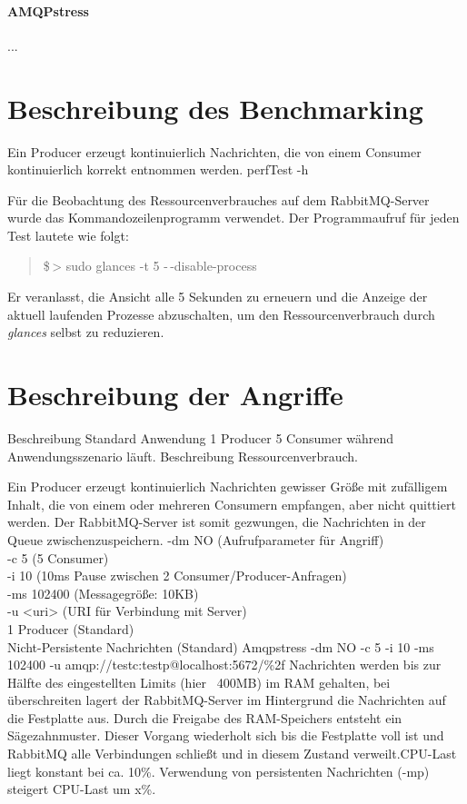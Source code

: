 \documentclass[	a4paper,
			11pt,
			titlepage,
			oneside,
			fleqn,
			listof=totoc,
			parskip,
			chapterprefix=false,
			numbers=noenddot]{scrartcl}
\begin{document}
	
	\paragraph{AMQPstress} ...
	
\clearpage
\section*{Beschreibung des Benchmarking}

		{Ein Producer erzeugt kontinuierlich Nachrichten, die von einem Consumer kontinuierlich korrekt entnommen werden.}%
		{perfTest -h}%
		{}

	Für die Beobachtung des Ressourcenverbrauches auf dem RabbitMQ-Server wurde das Kommandozeilenprogramm  verwendet. Der Programmaufruf für jeden Test lautete wie folgt:
	\begin{quote}
		\ttfamily
		\$\,> sudo glances -t 5 -\,-disable-process
	\end{quote}
	Er veranlasst, die Ansicht alle 5 Sekunden zu erneuern und die Anzeige der aktuell laufenden Prozesse abzuschalten, um den Ressourcenverbrauch durch \textsl{glances} selbst zu reduzieren.
	
\clearpage
\section*{Beschreibung der Angriffe}

	Beschreibung Standard Anwendung 1 Producer 5 Consumer während Anwendungsszenario läuft. Beschreibung Ressourcenverbrauch.

\clearpage
		{Ein Producer erzeugt kontinuierlich Nachrichten gewisser Größe mit zufälligem Inhalt, die von einem oder mehreren Consumern empfangen, aber nicht quittiert werden.%
		 Der RabbitMQ-Server ist somit gezwungen, die Nachrichten in der Queue zwischenzuspeichern.}%
		{%
		 -dm NO (Aufrufparameter für Angriff) \\
		 -c 5 (5 Consumer) \\
		 -i 10 (10ms Pause zwischen 2 Consumer/Producer-Anfragen) \\
		 -ms 102400 (Messagegröße: 10KB) \\
		 -u <uri> (URI für Verbindung mit Server) \\
		 1 Producer (Standard) \\
		 Nicht-Persistente Nachrichten (Standard)
		}%
		{Amqpstress -dm NO -c 5 -i 10 -ms 102400 -u amqp://testc:testp@localhost:5672/\%2f}%
		{Nachrichten werden bis zur Hälfte des eingestellten Limits (hier ~400MB) im RAM gehalten, bei überschreiten lagert der RabbitMQ-Server im Hintergrund die Nachrichten auf die Festplatte aus. Durch die Freigabe des RAM-Speichers entsteht ein Sägezahnmuster. Dieser Vorgang wiederholt sich bis die Festplatte voll ist und RabbitMQ alle Verbindungen schließt und in diesem Zustand verweilt.CPU-Last liegt konstant bei ca. 10\%.}%
		{Verwendung von persistenten Nachrichten (-mp) steigert CPU-Last um x\%.}
		
\end{document}
